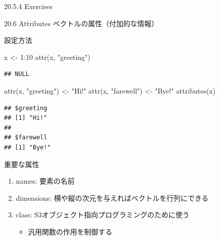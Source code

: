 \documentclass[
  ignorenonframetext,
]{beamer}
\newenvironment{Shaded}{\begin{snugshade}}{\end{snugshade}}
\newcommand{\DecValTok}[1]{\textcolor[rgb]{0.00,0.00,0.81}{#1}}
\newcommand{\FunctionTok}[1]{\textcolor[rgb]{0.00,0.00,0.00}{#1}}
\newcommand{\NormalTok}[1]{#1}
\newcommand{\OtherTok}[1]{\textcolor[rgb]{0.56,0.35,0.01}{#1}}
\newcommand{\SpecialCharTok}[1]{\textcolor[rgb]{0.00,0.00,0.00}{#1}}
\newcommand{\StringTok}[1]{\textcolor[rgb]{0.31,0.60,0.02}{#1}}
\providecommand{\tightlist}{%
  \setlength{\itemsep}{0pt}\setlength{\parskip}{0pt}}
\begin{document}
\begin{frame}{20.5.4 Exercises}
\protect\hypertarget{exercises-2}{}
\end{frame}

\begin{frame}{20.6 Attributes}
\protect\hypertarget{attributes}{}
ベクトルの属性（付加的な情報）
\end{frame}

\begin{frame}[fragile]{設定方法}
\protect\hypertarget{ux8a2dux5b9aux65b9ux6cd5}{}
\begin{Shaded}
\begin{Highlighting}[]
\NormalTok{x }\OtherTok{\textless{}{-}} \DecValTok{1}\SpecialCharTok{:}\DecValTok{10}
\FunctionTok{attr}\NormalTok{(x, }\StringTok{"greeting"}\NormalTok{)}
\end{Highlighting}
\end{Shaded}

\begin{verbatim}
## NULL
\end{verbatim}

\begin{Shaded}
\begin{Highlighting}[]
\FunctionTok{attr}\NormalTok{(x, }\StringTok{"greeting"}\NormalTok{) }\OtherTok{\textless{}{-}} \StringTok{"Hi!"}
\FunctionTok{attr}\NormalTok{(x, }\StringTok{"farewell"}\NormalTok{) }\OtherTok{\textless{}{-}} \StringTok{"Bye!"}
\FunctionTok{attributes}\NormalTok{(x)}
\end{Highlighting}
\end{Shaded}

\begin{verbatim}
## $greeting
## [1] "Hi!"
## 
## $farewell
## [1] "Bye!"
\end{verbatim}
\end{frame}

\begin{frame}{重要な属性}
\protect\hypertarget{ux91cdux8981ux306aux5c5eux6027}{}
\begin{enumerate}
\tightlist
\item
  names: 要素の名前
\item
  dimensions: 横や縦の次元を与えればベクトルを行列にできる
\item
  class: S3オブジェクト指向プログラミングのために使う

  \begin{itemize}
  \tightlist
  \item
    汎用関数の作用を制御する
  \end{itemize}
\end{enumerate}
\end{frame}
\end{document}
